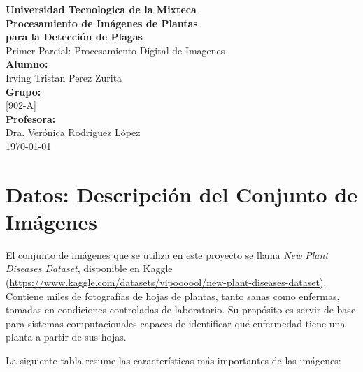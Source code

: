 \documentclass[11pt,a4paper]{article}
\begin{document}
\begin{titlepage}
    \centering
    \vspace*{2cm}
    
    {\Huge \textbf{Universidad Tecnologica de la Mixteca}}\\[2cm]
    
    {\huge \textbf{Procesamiento de Imágenes de Plantas \\ para la Detección de Plagas}}\\[1.5cm]
    
    {\Large Primer Parcial: Procesamiento Digital de Imagenes}\\[2.5cm]
    
    {\large \textbf{Alumno:}}\\
    {\Large Irving Tristan Perez Zurita}\\[0.5cm]
    
    {\large \textbf{Grupo:}}\\
    {\Large [902-A]}\\[2cm]
    
    {\large \textbf{Profesora:}}\\
    {\Large Dra. Verónica Rodríguez López}\\[2cm]
    
    \vfill
    {\large \today}
\end{titlepage}

\newpage

\section{Datos: Descripción del Conjunto de Imágenes}

El conjunto de imágenes que se utiliza en este proyecto se llama \textit{New Plant Diseases Dataset},
disponible en Kaggle (\url{https://www.kaggle.com/datasets/vipoooool/new-plant-diseases-dataset}).
Contiene miles de fotografías de hojas de plantas, tanto sanas como enfermas,
tomadas en condiciones controladas de laboratorio. Su propósito es servir de base para
sistemas computacionales capaces de identificar qué enfermedad tiene una planta a partir
de sus hojas.

La siguiente tabla resume las características más importantes de las imágenes:
\end{document}
